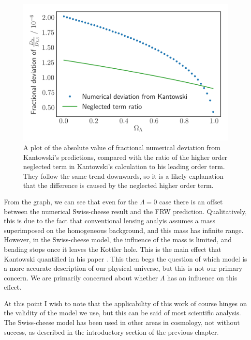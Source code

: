 \begin{figure}
  \centering
  \includegraphics[height=0.5\linewidth]{images/flat-neglected.png}
  \caption{A plot of the absolute value of fractional numerical deviation from Kantowski's predictions, compared with the ratio of the higher order neglected term in Kantowski's calculation to his leading order term. They follow the same trend downwards, so it is a likely explanation that the difference is caused by the neglected higher order term.}
  \label{fig:flat-const-m-neglected}
\end{figure}

From the graph, we can see that even for the $\Lambda = 0$ case there is an offset between the numerical Swiss-cheese result and the FRW prediction. Qualitatively, this is due to the fact that conventional lensing analyis assumes a mass superimposed on the homogeneous background, and this mass has infinite range. However, in the Swiss-cheese model, the influence of the mass is limited, and bending stops once it leaves the Kottler hole. This is the main effect that Kantowski quantified in his paper \citet{kantowski2010gravitational}. This then begs the question of which model is a more accurate description of our physical universe, but this is not our primary concern. We are primarily concerned about whether $\Lambda$ has an influence on this effect. 

At this point I wish to note that the applicability of this work of course hinges on the validity of the model we use, but this can be said of most scientific analysis. The Swiss-cheese model has been used in other areas in cosmology, not without success, as described in the introductory section of the previous chapter.  

